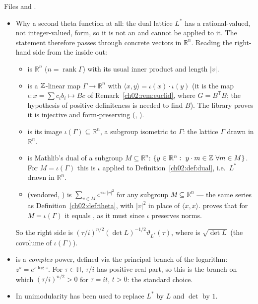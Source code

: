 \begin{dictionary}
Files  and .
\begin{itemize}
\item Why a second theta function at all: the dual lattice $L^*$ has a rational-valued, not
  integer-valued, form, so it is not an  and 
  cannot be applied to it.  The statement therefore passes through concrete vectors in
  $\mathbb{R}^n$.  Reading the right-hand side from the inside out:
  \begin{itemize}
  \item {} is $\mathbb{R}^n$ ($n=\operatorname{rank}\Gamma$)
    with its usual inner product and length $|v|$.
  \item {} is a ${\mathbb{Z}}$-linear map $\Gamma\to\mathbb{R}^n$ with
    $\langle x,y\rangle=\iota(x)\cdot\iota(y)$ (it is the map $\iota:x=\sum c_ib_i\mapsto Bc$ of
    Remark~\ref{ch02:rem:euclid}, where $G=B^{\mathsf T}B$; the hypothesis  of positive
    definiteness is needed to find $B$).  The library proves it is injective and form-preserving
    (, ).
  \item {} is its image $\iota(\Gamma)\subseteq\mathbb{R}^n$,
    a subgroup isometric to $\Gamma$: the lattice $\Gamma$ drawn in $\mathbb{R}^n$.
  \item {} is Mathlib's dual of a subgroup
    $M\subseteq\mathbb{R}^n$: $\{y\in\mathbb{R}^n:\ y\cdot m\in{\mathbb{Z}}\ \forall m\in M\}$.  For
    $M=\iota(\Gamma)$ this is $\iota$ applied to Definition~\ref{ch02:def:dual}, i.e.\ $L^*$
    drawn in $\mathbb{R}^n$.
  \item {} (vendored, ) is
    $\sum_{v\in M}e^{\pi i\tau|v|^2}$ for any subgroup $M\subseteq\mathbb{R}^n$ --- the same series
    as Definition~\ref{ch02:def:theta}, with $|v|^2$ in place of $\langle x,x\rangle$.
     proves that for $M=\iota(\Gamma)$ it equals
    , as it must since $\iota$ preserves norms.
  \end{itemize}
  So the right side is $(\tau/i)^{n/2}(\det L)^{-1/2}\vartheta_{L^*}(\tau)$, where
   is $\sqrt{\det L}$ (the covolume of $\iota(\Gamma)$).
\item {} is a \emph{complex} power, defined via the
  principal branch of the logarithm: $z^s=e^{s\log z}$.  For $\tau\in\mathbb{H}$, $\tau/i$ has
  positive real part, so this is the branch on which $(\tau/i)^{n/2}>0$ for $\tau=it$, $t>0$: the
  standard choice.
\item In  unimodularity has been used to replace $L^*$ by $L$ and $\det$
  by $1$.
\end{itemize}
\end{dictionary}
